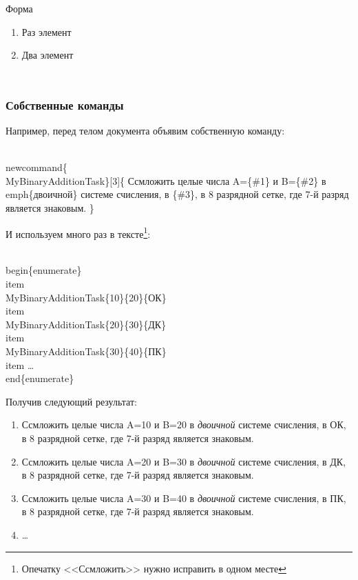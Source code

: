 \begin{frame}
\begin{itemize}
\begin{columns}
            \begin{block}{Форма}
                \begin{enumerate}                
                    \item Раз элемент 
                    \item Два элемент 
                \end{enumerate}                
            \end{block}
    \end{columns}

\end{itemize}
\begin{verbatim}
\end{verbatim}
\end{frame}


\begin{frame}
    \frametitle{Собственные команды}

    \newcommand{\MyBinaryAdditionTask}[3]{
      Ссмложить целые числа A={#1} и B={#2} в \emph{двоичной} 
      системе счисления, в {#3}, в 8 разрядной сетке, 
      где 7-й разряд является знаковым.
    }
    
Например, перед телом документа объявим собственную команду:
\begin{semiverbatim}  
\\newcommand\{\alert{\\MyBinaryAdditionTask}\}[\alert{3}]\{
  С\alert{см}ложить целые числа A=\{\alert{\#1}\} и B=\{\alert{\#2}\} в \\emph\{двоичной\} 
  системе счисления, в \{\alert{\#3}\}, в 8 разрядной сетке, где 7-й 
  разряд является знаковым.
\}  
\end{semiverbatim}    

И используем много раз в тексте\footnote{Опечатку <<Ссмложить>> нужно исправить в \alert{одном} месте}:
\begin{semiverbatim}  
\\begin\{enumerate\}
    \\item \\MyBinaryAdditionTask\{10\}\{20\}\{ОК\}
    \\item \\MyBinaryAdditionTask\{20\}\{30\}\{ДК\}
    \\item \\MyBinaryAdditionTask\{30\}\{40\}\{ПК\}
    \\item \ldots
\\end\{enumerate\}
\end{semiverbatim}    

Получив следующий результат:
\begin{enumerate}
    \item \MyBinaryAdditionTask{10}{20}{ОК}
    \item \MyBinaryAdditionTask{20}{30}{ДК}
    \item \MyBinaryAdditionTask{30}{40}{ПК}
    \item \ldots
\end{enumerate}

\end{frame}


